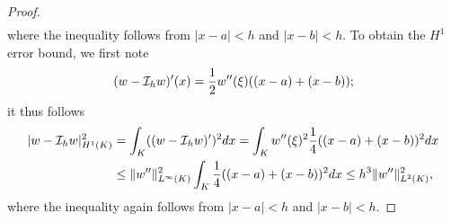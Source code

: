 \begin{lemma}
\begin{proof}
\begin{align*}
  \end{align*}
  where the inequality follows from $|x-a| < h$ and $|x-b| < h$.  To obtain the $H^1$ error bound, we first note
  \begin{equation*}
    (w - \mathcal{I}_hw)'(x) = \frac{1}{2} w''(\xi) ((x-a) + (x-b));
  \end{equation*}
  it thus follows
  \begin{align*}
    | w - \mathcal{I}_h w |^2_{H^1(K)}
    &= \int_K ((w - \mathcal{I}_h w)')^2 dx
    = \int_K w''(\xi)^2 \frac{1}{4} ((x-a) + (x-b))^2 dx
    \\
    &\leq \| w'' \|_{L^\infty(K)}^2 \int_K \frac{1}{4} ((x-a) + (x-b))^2 dx
    \leq h^3\| w'' \|_{L^2(K)}^2,
  \end{align*}
  where the inequality again follows from $|x - a| < h$ and $|x - b| < h$.
    \end{proof}
\end{lemma}

